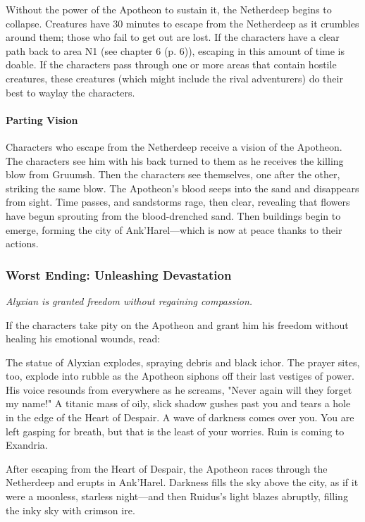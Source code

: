 \documentclass[letterpaper, 11pt, bg=full, twocolumn]{dndbook}
\begin{document}
Without the power of the Apotheon to sustain it, the Netherdeep begins to collapse. Creatures have 30 minutes to escape from the Netherdeep as it crumbles around them; those who fail to get out are lost. If the characters have a clear path back to area N1 (see chapter 6 (p. 6)), escaping in this amount of time is doable. If the characters pass through one or more areas that contain hostile creatures, these creatures (which might include the rival adventurers) do their best to waylay the characters.

\paragraph{Parting Vision}

Characters who escape from the Netherdeep receive a vision of the Apotheon. The characters see him with his back turned to them as he receives the killing blow from Gruumsh. Then the characters see themselves, one after the other, striking the same blow. The Apotheon's blood seeps into the sand and disappears from sight. Time passes, and sandstorms rage, then clear, revealing that flowers have begun sprouting from the blood-drenched sand. Then buildings begin to emerge, forming the city of Ank'Harel---which is now at peace thanks to their actions.

\subsubsection{Worst Ending: Unleashing Devastation}

\textit{Alyxian is granted freedom without regaining compassion.}

If the characters take pity on the Apotheon and grant him his freedom without healing his emotional wounds, read:

\begin{DndReadAloud}
The statue of Alyxian explodes, spraying debris and black ichor. The prayer sites, too, explode into rubble as the Apotheon siphons off their last vestiges of power. His voice resounds from everywhere as he screams, "Never again will they forget my name!" A titanic mass of oily, slick shadow gushes past you and tears a hole in the edge of the Heart of Despair.
A wave of darkness comes over you. You are left gasping for breath, but that is the least of your worries.
Ruin is coming to Exandria.
\end{DndReadAloud}

After escaping from the Heart of Despair, the Apotheon races through the Netherdeep and erupts in Ank'Harel. Darkness fills the sky above the city, as if it were a moonless, starless night---and then Ruidus's light blazes abruptly, filling the inky sky with crimson ire.
\end{document}
